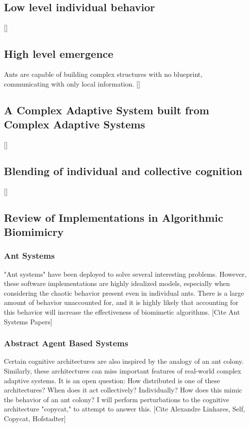 \documentclass{nature}
\begin{document}
\subsection{Low level individual behavior}
    []
\subsection{High level emergence}
    Ants are capable of building complex structures with no blueprint, communicating with only local information.
    []
\subsection{A Complex Adaptive System built from Complex Adaptive Systems}
    []
\subsection{Blending of individual and collective cognition}
    []
\subsection{Review of Implementations in Algorithmic Biomimicry}
    \subsubsection{Ant Systems}
        "Ant systems" have been deployed to solve several interesting problems. 
        However, these software implementations are highly idealized models, especially when considering the chaotic behavior present even in individual ants. 
        There is a large amount of behavior unaccounted for, and it is highly likely that accounting for this behavior will increase the effectiveness of biomimetic algorithms.
        [Cite Ant Systems Papers]

    \subsubsection{Abstract Agent Based Systems}
        Certain cognitive architectures are also inspired by the analogy of an ant colony. 
        Similarly, these architectures can miss important features of real-world complex adaptive systems.
        It is an open question: How distributed is one of these architectures? When does it act collectively? Individually? How does this mimic the behavior of an ant colony?
        I will perform perturbations to the cognitive architecture "copycat," to attempt to answer this.
        [Cite Alexandre Linhares, Self, Copycat, Hofstadter]
\end{document}
